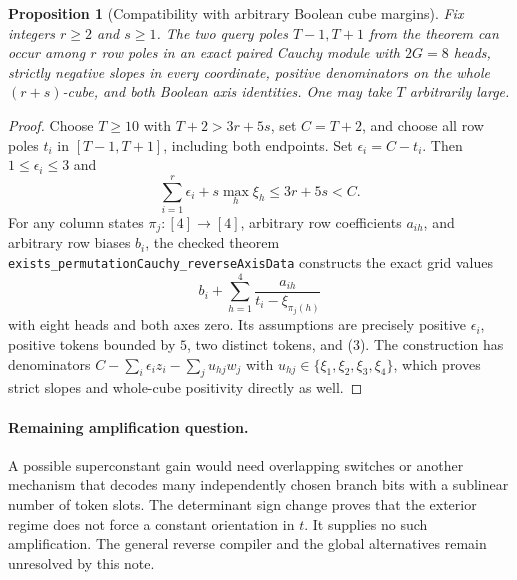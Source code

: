 \documentclass[11pt]{article}
\newtheorem{proposition}[theorem]{Proposition}
\begin{document}
\begin{proposition}[Compatibility with arbitrary Boolean cube margins]
Fix integers $r\geq2$ and $s\geq1$. The two query poles $T-1,T+1$
from the theorem can occur among $r$ row poles in an exact paired
Cauchy module with $2G=8$ heads, strictly negative slopes in every
coordinate, positive denominators on the whole $(r+s)$-cube, and both
Boolean axis identities. One may take $T$ arbitrarily large.
\end{proposition}
\begin{proof}
Choose $T\geq10$ with $T+2>3r+5s$, set $C=T+2$, and choose all
row poles $t_i$ in $[T-1,T+1]$, including both endpoints. Set
$\epsilon_i=C-t_i$. Then $1\leq\epsilon_i\leq3$ and
\[
 \sum_{i=1}^r\epsilon_i+s\max_h\xi_h
       \leq3r+5s<C.
 \tag{3}
\]
For any column states $\pi_j:[4]\to[4]$, arbitrary row coefficients
$a_{ih}$, and arbitrary row biases $b_i$, the checked theorem
\texttt{exists\_permutationCauchy\_reverseAxisData} constructs the
exact grid values
\[
 b_i+\sum_{h=1}^4\frac{a_{ih}}{t_i-\xi_{\pi_j(h)}}
\]
with eight heads and both axes zero. Its assumptions are precisely
positive $\epsilon_i$, positive tokens bounded by $5$, two distinct
tokens, and (3). The construction has denominators
$C-\sum_i\epsilon_i z_i-\sum_j u_{hj}w_j$ with
$u_{hj}\in\{\xi_1,\xi_2,\xi_3,\xi_4\}$, which proves strict
slopes and whole-cube positivity directly as well.
\end{proof}

\paragraph{Remaining amplification question.}
A possible superconstant gain would need overlapping switches or another
mechanism that decodes many independently chosen branch bits with a
sublinear number of token slots. The determinant sign change proves
that the exterior regime does not force a constant orientation in $t$.
It supplies no such amplification. The general reverse compiler and
the global alternatives remain unresolved by this note.
\end{document}
